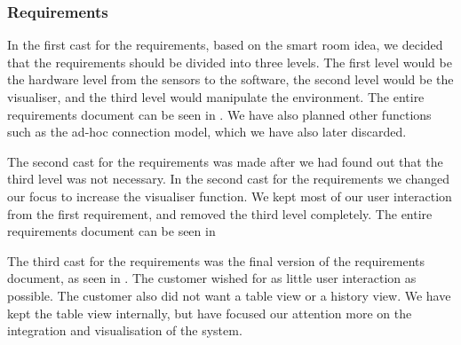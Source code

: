 \documentclass[../document.tex]{subfiles}
\begin{document}
\subsubsection{Requirements}
In the first cast for the requirements, based on the smart room idea, we decided that the requirements should be divided into three levels. The first level would be the hardware level from the sensors to the software, the second level would be the visualiser, and the third level would manipulate the environment. The entire requirements document can be seen in . We have also planned other functions such as the ad-hoc connection model, which we have also later discarded. 

The second cast for the requirements was made after we had found out that the third level was not necessary. In the second cast for the requirements we changed our focus to increase the visualiser function. We kept most of our user interaction from the first requirement, and removed the third level completely. The entire requirements document can be seen in 

The third cast for the requirements was the final version of the requirements document, as seen in . The customer wished for as little user interaction as possible. The customer also did not want a table view or a history view. We have kept the table view internally, but have focused our attention more on the integration and visualisation of the system.
\end{document}
